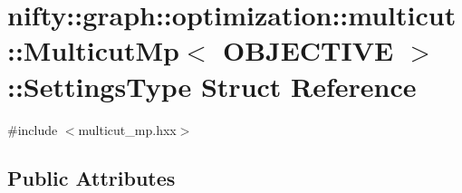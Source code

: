 \hypertarget{structnifty_1_1graph_1_1optimization_1_1multicut_1_1MulticutMp_1_1SettingsType}{}\section{nifty\+:\+:graph\+:\+:optimization\+:\+:multicut\+:\+:Multicut\+Mp$<$ O\+B\+J\+E\+C\+T\+I\+V\+E $>$\+:\+:Settings\+Type Struct Reference}
\label{structnifty_1_1graph_1_1optimization_1_1multicut_1_1MulticutMp_1_1SettingsType}


{\ttfamily \#include $<$multicut\+\_\+mp.\+hxx$>$}

\subsection*{Public Attributes}
